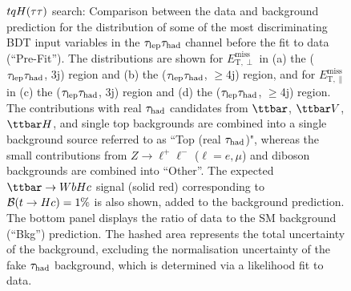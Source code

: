 \begin{figure}[t]
\begin{center}
\caption{$tqH(\tau\tau)$ search: Comparison between the data and background prediction for the distribution of some of the most
discriminating BDT input variables in the $\tau_{\mathrm{lep}} \tau_{\mathrm{had}}$ channel before the fit to data (``Pre-Fit''). The distributions are shown for
$E_{\text{T},\perp}^{\text{miss}}$ in (a) the ($\tau_{\mathrm{lep}} \tau_{\mathrm{had}}$, 3j) region and (b) the ($\tau_{\mathrm{lep}} \tau_{\mathrm{had}}$, $\geq$4j) region, and for
$E_{\text{T},\parallel}^{\text{miss}}$ in (c) the ($\tau_{\mathrm{lep}} \tau_{\mathrm{had}}$, 3j)  region and (d) the ($\tau_{\mathrm{lep}} \tau_{\mathrm{had}}$, $\geq$4j) region.
The contributions with real $\tau_{\mathrm{had}}$ candidates from $\ttbar$,  $\ttbar V$, $\ttbar H$, and single top backgrounds are combined into
a single background source referred to as ``Top (real $\tau_{\mathrm{had}}$)", whereas the small contributions from 
$Z\to \ell^+\ell^-$ ($\ell = e, \mu$) and diboson backgrounds are combined into ``Other''. 
The expected $\Hc$ signal (solid red) corresponding to $\mathcal{B}(t\to Hc)=1\%$ is also shown,
added to the background prediction.
The bottom panel displays the ratio of data to the SM background (``Bkg'') prediction.
The hashed area represents the total uncertainty of the background, excluding the normalisation uncertainty of the fake $\tau_{\mathrm{had}}$ background, 
which is determined via a likelihood fit to data.}
\label{fig:BDT_inputs_lephad_4}
\end{center}
\end{figure}



